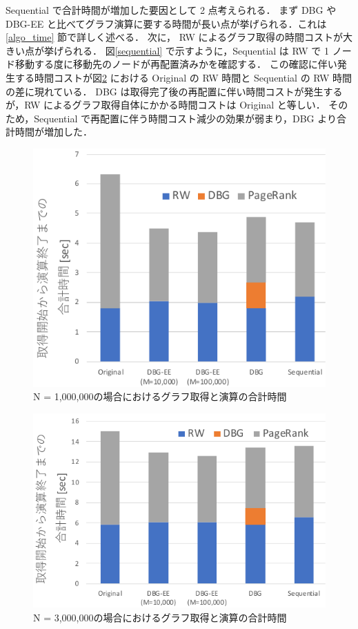 Sequential で合計時間が増加した要因として 2 点考えられる．
まず DBG や DBG-EE と比べてグラフ演算に要する時間が長い点が挙げられる．これは\ref{algo_time} 節で詳しく述べる．
次に， RW によるグラフ取得の時間コストが大きい点が挙げられる．
図\ref{sequential} で示すように，Sequential は RW で 1 ノード移動する度に移動先のノードが再配置済みかを確認する．
この確認に伴い発生する時間コストが図\ref{total_time_3000000} における Original の RW 時間と Sequential の RW 時間の差に現れている．
DBG は取得完了後の再配置に伴い時間コストが発生するが，RW によるグラフ取得自体にかかる時間コストは Original と等しい．
そのため，Sequential で再配置に伴う時間コスト減少の効果が弱まり，DBG より合計時間が増加した．
\begin{figure}[t]
  \centering
  \includegraphics[width=0.8\linewidth]{./figure/total_time_1000000.pdf}
  \caption{N = 1,000,000の場合におけるグラフ取得と演算の合計時間}
  \label{total_time_1000000}
\end{figure}
\begin{figure}[t]
  \centering
  \includegraphics[width=0.8\linewidth]{./figure/total_time_3000000.pdf}
  \caption{N = 3,000,000の場合におけるグラフ取得と演算の合計時間}
  \label{total_time_3000000}
\end{figure}

